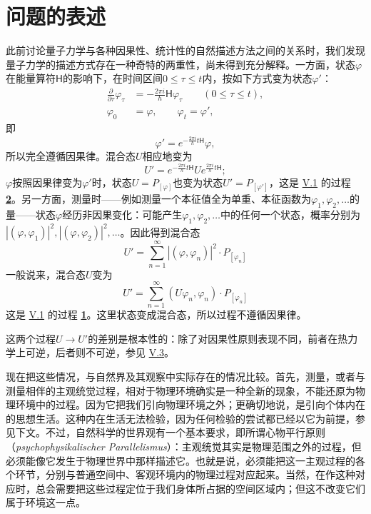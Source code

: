 \documentclass[fontsize=13pt,twoside,openany,headings=normal,parskip=false,bookmarkpackage=false,DIV=calc]{scrbook}
\begin{document}
\section{问题的表述}\label{sec:VI.1}
此前讨论量子力学与各种因果性、统计性的自然描述方法之间的关系时，我们发现量子力学的描述方式存在一种奇特的两重性，尚未得到充分解释。一方面，状态$\varphi$在能量算符$\mathsf H$的影响下，在时间区间$0\leq\tau\leq t$内，按如下方式变为状态$\varphi'$：
\begin{align*}
 \frac{\partial}{\partial\tau}\varphi_\tau
 &=-\frac{2\pi i}{h}\mathsf H\varphi_\tau\qquad(0\leq\tau\leq t),\\
 \varphi_0&=\varphi,\qquad\varphi_t=\varphi',
\end{align*}
即
\[
 \varphi'=e^{-\frac{2\pi i}{h}t\mathsf H}\varphi,
\]
所以完全遵循因果律。混合态$U$相应地变为
\[
 U'=e^{-\frac{2\pi i}{h}t\mathsf H}Ue^{\frac{2\pi i}{h}t\mathsf H};
\]
$\varphi$按照因果律变为$\varphi'$时，状态$U=P_{[\varphi]}$也变为状态$U'=P_{[\varphi']}$，这是 \hyperref[sec:V.1]{V.1} 的过程 \hyperref[eq:V.1.2]{\textbf{2}}。另一方面，测量时——例如测量一个本征值全为单重、本征函数为$\varphi_1,\allowbreak \varphi_2,\allowbreak \ldots$的量——状态$\varphi$经历非因果变化：可能产生$\varphi_1,\allowbreak \varphi_2,\allowbreak \ldots$中的任何一个状态，概率分别为$|(\varphi,\allowbreak \varphi_1)|^2,\allowbreak |(\varphi,\allowbreak \varphi_2)|^2,\allowbreak \ldots$。因此得到混合态
\[
 U'=\sum_{n=1}^{\infty}|(\varphi,\varphi_n)|^2\cdot P_{[\varphi_n]}
\]
一般说来，混合态$U$变为
\[
 U'=\sum_{n=1}^{\infty}(U\varphi_n,\varphi_n)\cdot P_{[\varphi_n]}
\]
这是 \hyperref[sec:V.1]{V.1} 的过程 \hyperref[eq:V.1.1]{\textbf{1}}。这里状态变成混合态，所以过程不遵循因果律。

这两个过程$U\longrightarrow U'$的差别是根本性的：除了对因果性原则表现不同，前者在热力学上可逆，后者则不可逆，参见 \hyperref[sec:V.3]{V.3}。

\hypertarget{origpage-223}{}\label{origpage-223}现在把这些情况，与自然界及其观察中实际存在的情况比较。首先，测量，或者与测量相伴的主观统觉过程，相对于物理环境确实是一种全新的现象，不能还原为物理环境中的过程。因为它把我们引向物理环境之外；更确切地说，是引向个体内在的思想生活。这种内在生活无法检验，因为任何检验的尝试都已经以它为前提，参见下文。不过，自然科学的世界观有一个基本要求，即所谓心物平行原则（\textit{psychophysikalischer Parallelismus}）：主观统觉其实是物理范围之外的过程，但必须能像它发生于物理世界中那样描述它。也就是说，必须能把这一主观过程的各个环节，分别与普通空间中、客观环境内的物理过程对应起来。当然，在作这种对应时，总会需要把这些过程定位于我们身体所占据的空间区域内；但这不改变它们属于环境这一点。
\end{document}
